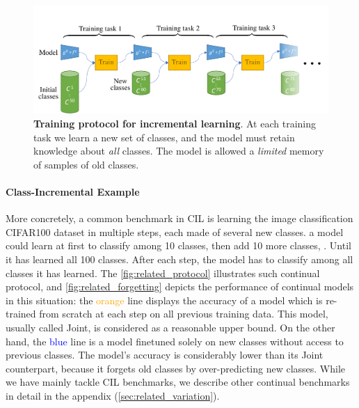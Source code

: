 \begin{figure}[tb]
      \begin{center}
            \includegraphics[width=1.0\linewidth]{images/related/protocol}
      \end{center}
      \caption{\textbf{Training protocol for incremental learning}. At each training task we learn a
            new set of classes, and the model must retain knowledge about \textit{all} classes. The
            model is allowed a \textit{limited} memory of samples of old classes.}
      \label{fig:related_protocol}
\end{figure}

\paragraph{Class-Incremental Example} More concretely, a common benchmark in \acf{CIL} is learning
the image classification CIFAR100 dataset \citep{krizhevskycifar100} in multiple steps, each made of
several new classes. \eg a model could learn at first to classify among 10 classes, then add 10 more
classes, \etc. Until it has learned all 100 classes. After each step, the model has to classify
among all classes it has learned. The \autoref{fig:related_protocol} illustrates such continual
protocol, and \autoref{fig:related_forgetting} depicts the performance of continual models in this
situation: the \textcolor{orange}{orange} line displays the accuracy of a model which is re-trained
from scratch at each step on all previous training data. This model, usually called Joint, is
considered as a reasonable upper bound. On the other hand, the \textcolor{blue}{blue} line is a
model finetuned solely on new classes without access to previous classes. The model's accuracy is
considerably lower than its Joint counterpart, because it forgets old classes by over-predicting new
classes. While we have mainly tackle \acf{CIL} benchmarks, we describe other continual benchmarks in
detail in the appendix (\autoref{sec:related_variation}).

